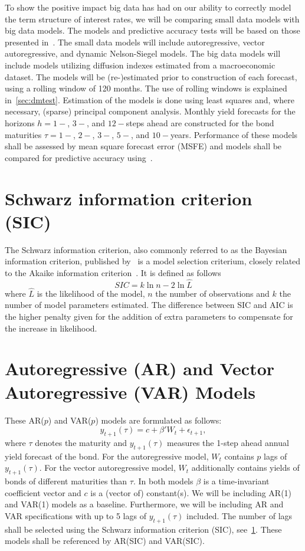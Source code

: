 To show the positive impact big data has had on our ability to correctly model the term structure of interest rates, we will be comparing small data models with big data models. 
The models and predictive accuracy tests will be based on those presented in~\textcite{Swanson2017}. 
The small data models will include autoregressive, vector autoregressive, and dynamic Nelson-Siegel models. 
The big data models will include models utilizing diffusion indexes estimated from a macroeconomic dataset. 
The models will be (re-)estimated prior to construction of each forecast, using a rolling window of 120 months. 
The use of rolling windows is explained in~\cref{sec:dmtest}. 
Estimation of the models is done using least squares and, where necessary, (sparse) principal component analysis. 
Monthly yield forecasts for the horizons $h = 1-$, $3-$, and $12-$steps ahead are constructed for the bond maturities $\tau = 1-$, $2-$, $3-$, $5-$, and $10-$years. 
Performance of these models shall be assessed by mean square forecast error (MSFE) and models shall be compared for predictive accuracy using~\textcite[hereafter DM]{Diebold1994}. 

\section{Schwarz information criterion (SIC)}
\label{sec:sic}
The Schwarz information criterion, also commonly referred to as the Bayesian information criterion, published by~\textcite[hereafter SIC]{Schwarz1978} is a model selection criterium, closely related to the Akaike information criterion~\parencite{Akaike1974}. 
It is defined as follows
\begin{equation}
	SIC = k\ln{n} - 2\ln{\hat{L}}
\end{equation}
where $\hat{L}$ is the likelihood of the model, $n$ the number of observations and $k$ the number of model parameters estimated. The difference between SIC and AIC is the higher penalty given for the addition of extra parameters to compensate for the increase in likelihood.

\section{Autoregressive (AR) and Vector Autoregressive (VAR) Models}
\label{sec:arvar}
These AR($p$) and VAR($p$) models are formulated as follows:
\begin{equation}
	y_{t+1}(\tau) = c + \beta' W_t + \epsilon_{t+1},
\end{equation}
where $\tau$ denotes the maturity and $y_{t+1}(\tau)$ measures the 1-step ahead annual yield forecast of the bond. 
For the autoregressive model, $W_t$ contains $p$ lags of $y_{t+1}(\tau)$. For the vector autoregressive model, $W_t$ additionally contains yields of bonds of different maturities than $\tau$. 
In both models $\beta$ is a time-invariant coefficient vector and $c$ is a (vector of) constant(s). 
We will be including AR(1) and VAR(1) models as a baseline. 
Furthermore, we will be including AR and VAR specifications with up to 5 lags of $y_{t+1}(\tau)$ included. 
The number of lags shall be selected using the Schwarz information criterion (SIC), see~\cref{sec:sic}. 
These models shall be referenced by AR(SIC) and VAR(SIC). 

